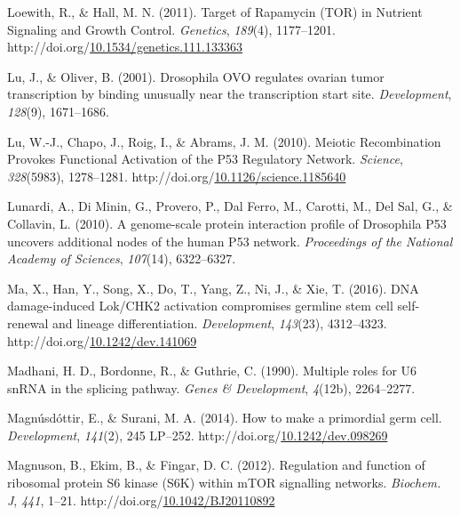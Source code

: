 \documentclass[12pt,oneside]{reedthesis}
\newlength{\cslhangindent}
\newenvironment{CSLReferences}[2] %
 {%
  \setlength{\parindent}{0pt}
  \ifodd #1 \everypar{\setlength{\hangindent}{\cslhangindent}}\ignorespaces\fi
  \ifnum #2 > 0
  \setlength{\parskip}{#2\baselineskip}
  \fi
 }%
 {}
\begin{document}
\begin{CSLReferences}{1}{0}
\leavevmode{}%
Loewith, R., \& Hall, M. N. (2011). Target of {Rapamycin} ({TOR}) in {Nutrient Signaling} and {Growth Control}. \emph{Genetics}, \emph{189}(4), 1177--1201. http://doi.org/\href{https://doi.org/10.1534/genetics.111.133363}{10.1534/genetics.111.133363}

\leavevmode{}%
Lu, J., \& Oliver, B. (2001). Drosophila {OVO} regulates ovarian tumor transcription by binding unusually near the transcription start site. \emph{Development}, \emph{128}(9), 1671--1686.

\leavevmode{}%
Lu, W.-J., Chapo, J., Roig, I., \& Abrams, J. M. (2010). Meiotic {Recombination Provokes Functional Activation} of the P53 {Regulatory Network}. \emph{Science}, \emph{328}(5983), 1278--1281. http://doi.org/\href{https://doi.org/10.1126/science.1185640}{10.1126/science.1185640}

\leavevmode{}%
Lunardi, A., Di Minin, G., Provero, P., Dal Ferro, M., Carotti, M., Del Sal, G., \& Collavin, L. (2010). A genome-scale protein interaction profile of {Drosophila} P53 uncovers additional nodes of the human P53 network. \emph{Proceedings of the National Academy of Sciences}, \emph{107}(14), 6322--6327.

\leavevmode{}%
Ma, X., Han, Y., Song, X., Do, T., Yang, Z., Ni, J., \& Xie, T. (2016). {DNA} damage-induced {Lok}/{CHK2} activation compromises germline stem cell self-renewal and lineage differentiation. \emph{Development}, \emph{143}(23), 4312--4323. http://doi.org/\href{https://doi.org/10.1242/dev.141069}{10.1242/dev.141069}

\leavevmode{}%
Madhani, H. D., Bordonne, R., \& Guthrie, C. (1990). Multiple roles for {U6 snRNA} in the splicing pathway. \emph{Genes \& Development}, \emph{4}(12b), 2264--2277.

\leavevmode{}%
Magnúsdóttir, E., \& Surani, M. A. (2014). How to make a primordial germ cell. \emph{Development}, \emph{141}(2), 245 LP--252. http://doi.org/\href{https://doi.org/10.1242/dev.098269}{10.1242/dev.098269}

\leavevmode{}%
Magnuson, B., Ekim, B., \& Fingar, D. C. (2012). Regulation and function of ribosomal protein {S6} kinase ({S6K}) within {mTOR} signalling networks. \emph{Biochem. J}, \emph{441}, 1--21. http://doi.org/\href{https://doi.org/10.1042/BJ20110892}{10.1042/BJ20110892}


\end{CSLReferences}
\end{document}
